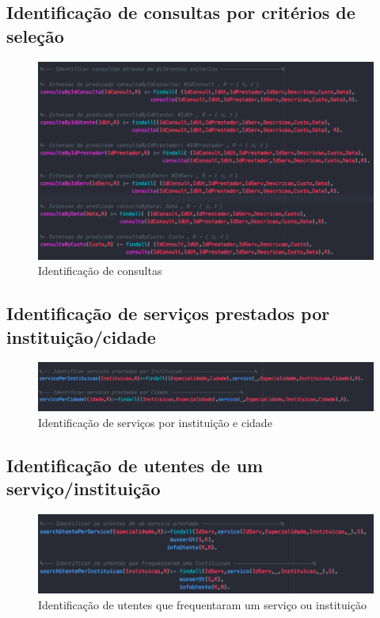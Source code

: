 \documentclass[25pt]{article}
\begin{document}
\subsection{Identificação de consultas por critérios de seleção}
\begin{figure}[H]
\centering\includegraphics[scale=0.5]{criterioconsulta}
\caption{\label{fig:controller}Identificação de consultas}
\end{figure}
\subsection{Identificação de serviços prestados por instituição/cidade}
\begin{figure}[H]
\centering\includegraphics[scale=0.5]{PerInsCidade}
\caption{\label{fig:controller}Identificação de serviços por instituição e cidade}
\end{figure}

\subsection{Identificação de utentes de um serviço/instituição}

\begin{figure}[H]
\centering\includegraphics[scale=0.5]{Perserviceinst}
\caption{\label{fig:controller}Identificação de utentes que frequentaram um serviço ou instituição}
\end{figure}
\end{document}
